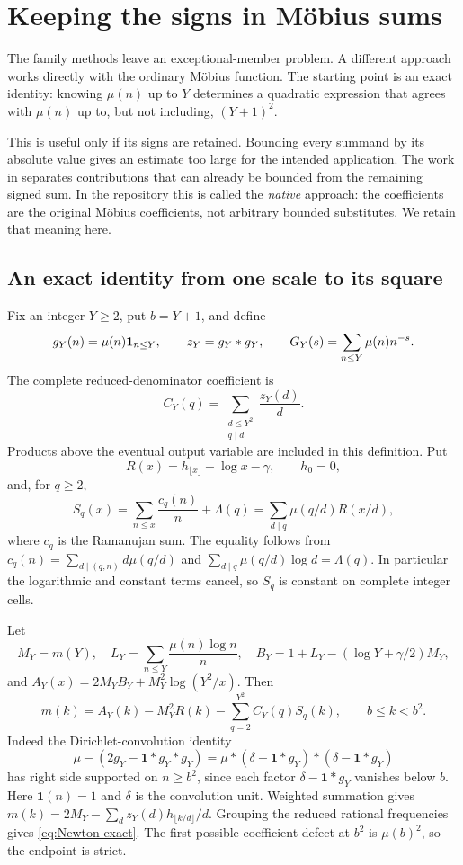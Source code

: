 \section{Keeping the signs in M\"obius sums}\label{sec:native}

The family methods leave an exceptional-member problem. A different approach works directly with the ordinary M\"obius function. The starting point is an exact identity: knowing $\mu(n)$ up to $Y$ determines a quadratic expression that agrees with $\mu(n)$ up to, but not including, $(Y+1)^2$.

This is useful only if its signs are retained. Bounding every summand by its absolute value gives an estimate too large for the intended application. The work in \cite{R994,R1003} separates contributions that can already be bounded from the remaining signed sum. In the repository this is called the \emph{native} approach: the coefficients are the original M\"obius coefficients, not arbitrary bounded substitutes. We retain that meaning here.

\subsection{An exact identity from one scale to its square}
Fix an integer $Y\ge2$, put $b=Y+1$, and define
\[
 g_Y(n)=\mu(n)\mathbf 1_{n\le Y},\qquad z_Y=g_Y*g_Y,\qquad
 G_Y(s)=\sum_{n\le Y}\mu(n)n^{-s}.
\]
The complete reduced-denominator coefficient is
\begin{equation}\label{eq:CY}
 C_Y(q)=\sum_{\substack{d\le Y^2\\q\mid d}}\frac{z_Y(d)}d.
\end{equation}
Products above the eventual output variable are included in this definition. Put
\[
 R(x)=h_{\lfloor x\rfloor}-\log x-\gamma,\qquad h_0=0,
\]
and, for $q\ge2$,
\begin{equation}\label{eq:Sq}
 S_q(x)=\sum_{n\le x}\frac{c_q(n)}n+\Lambda(q)
       =\sum_{d\mid q}\mu(q/d)R(x/d),
\end{equation}
where $c_q$ is the Ramanujan sum. The equality follows from
$c_q(n)=\sum_{d\mid(q,n)}d\mu(q/d)$ and
$\sum_{d\mid q}\mu(q/d)\log d=\Lambda(q)$. In particular the logarithmic and constant terms cancel, so $S_q$ is constant on complete integer cells.

Let
\[
 M_Y=m(Y),\quad L_Y=\sum_{n\le Y}\frac{\mu(n)\log n}{n},\quad
 B_Y=1+L_Y-(\log Y+\gamma/2)M_Y,
\]
and $A_Y(x)=2M_YB_Y+M_Y^2\log(Y^2/x)$. Then
\begin{equation}\label{eq:Newton-exact}
 m(k)=A_Y(k)-M_Y^2R(k)-\sum_{q=2}^{Y^2}C_Y(q)S_q(k),
 \qquad b\le k<b^2.
\end{equation}
Indeed the Dirichlet-convolution identity
\[
 \mu-(2g_Y-\mathbf1*g_Y*g_Y)
 =\mu*(\delta-\mathbf1*g_Y)* (\delta-\mathbf1*g_Y)
\]
has right side supported on $n\ge b^2$, since each factor $\delta-\mathbf1*g_Y$ vanishes below $b$. Here $\mathbf1(n)=1$ and $\delta$ is the convolution unit. Weighted summation gives
$m(k)=2M_Y-\sum_d z_Y(d)h_{\lfloor k/d\rfloor}/d$. Grouping the reduced rational frequencies gives \eqref{eq:Newton-exact}. The first possible coefficient defect at $b^2$ is $\mu(b)^2$, so the endpoint is strict.

